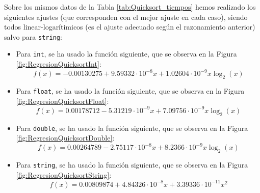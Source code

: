\documentclass[12pt]{article}
\begin{document}
    Sobre los mismos datos de la Tabla \ref{tab:Quicksort_tiempos} hemos realizado los siguientes ajustes (que corresponden con el mejor ajuste en cada caso), siendo todos linear-logarítimicos (es el ajuste adecuado según el razonamiento anterior) salvo para \verb|string|:
    \begin{itemize}
        \item Para \verb|int|, se ha usado la función siguiente, que se observa en la Figura \ref{fig:RegresionQuicksortInt}:
        $$f(x)=-0.00130275+9.59332\cdot 10^{-8}x + 1.02604\cdot 10^{-9}x\log_2(x)$$
    
        \item Para \verb|float|, se ha usado la función siguiente, que se observa en la Figura \ref{fig:RegresionQuicksortFloat}:
        $$f(x)=0.00178712-5.31219\cdot 10^{-9} x+7.09756\cdot 10^{-9}x\log_2(x)$$
    
        \item Para \verb|double|, se ha usado la función siguiente, que se observa en la Figura \ref{fig:RegresionQuicksortDouble}:
        $$f(x)=0.00264789-2.75117\cdot 10^{-8}x +8.2366\cdot 10^{-9}x\log_2(x)$$
    
        \item Para \verb|string|, se ha usado la función siguiente, que se observa en la Figura \ref{fig:RegresionQuicksortString}:
        $$f(x)=0.00809874+4.84326\cdot 10^{-8} x+3.39336\cdot 10^{-11} x^2$$
    \end{itemize}
\end{document}
